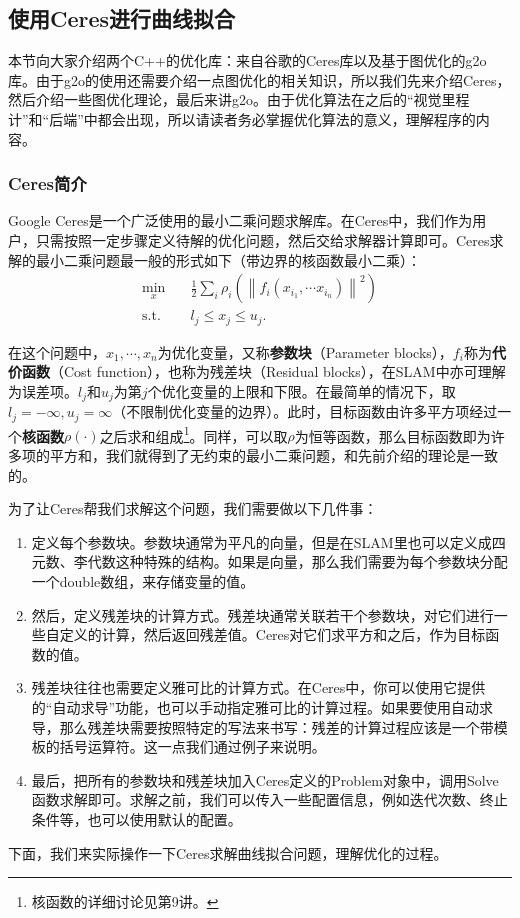 \subsection{使用Ceres进行曲线拟合}
本节向大家介绍两个C++的优化库：来自谷歌的Ceres库\textsuperscript{\cite{Ceres}}以及基于图优化的g2o库\textsuperscript{\cite{Kummerle2011}}。由于g2o的使用还需要介绍一点图优化的相关知识，所以我们先来介绍Ceres，然后介绍一些图优化理论，最后来讲g2o。由于优化算法在之后的“视觉里程计”和“后端”中都会出现，所以请读者务必掌握优化算法的意义，理解程序的内容。

\subsubsection{Ceres简介}
Google Ceres是一个广泛使用的最小二乘问题求解库。在Ceres中，我们作为用户，只需按照一定步骤定义待解的优化问题，然后交给求解器计算即可。Ceres求解的最小二乘问题最一般的形式如下（带边界的核函数最小二乘）：
\begin{equation}
\begin{array}{ll}
\min \limits_x \quad & \frac{1}{2}\sum\limits_i {{\rho _i}\left( {{{\left\| {{f_i}\left( {{x_{{i_1}}}, \cdots {x_{{i_n}}}} \right)} \right\|}^2}} \right)} \\
\mathrm{s.t.} \quad & {l_j} \leqslant {x_j} \leqslant {u_j}.
\end{array}
\end{equation}

在这个问题中，$x_1, \cdots, x_n$为优化变量，又称\textbf{参数块}（Parameter blocks），$f_i$称为\textbf{代价函数}（Cost function），也称为残差块（Residual blocks），在SLAM中亦可理解为误差项。$l_j$和$u_j$为第$j$个优化变量的上限和下限。在最简单的情况下，取$l_j = -\infty, u_j=\infty$（不限制优化变量的边界）。此时，目标函数由许多平方项经过一个\textbf{核函数}$\rho(\cdot)$之后求和组成\footnote{核函数的详细讨论见第9讲。}。同样，可以取$\rho$为恒等函数，那么目标函数即为许多项的平方和，我们就得到了无约束的最小二乘问题，和先前介绍的理论是一致的。

为了让Ceres帮我们求解这个问题，我们需要做以下几件事：
\begin{enumerate}
\item 定义每个参数块。参数块通常为平凡的向量，但是在SLAM里也可以定义成四元数、李代数这种特殊的结构。如果是向量，那么我们需要为每个参数块分配一个double数组，来存储变量的值。
\item 然后，定义残差块的计算方式。残差块通常关联若干个参数块，对它们进行一些自定义的计算，然后返回残差值。Ceres对它们求平方和之后，作为目标函数的值。
\item 残差块往往也需要定义雅可比的计算方式。在Ceres中，你可以使用它提供的“自动求导”功能，也可以手动指定雅可比的计算过程。如果要使用自动求导，那么残差块需要按照特定的写法来书写：残差的计算过程应该是一个带模板的括号运算符。这一点我们通过例子来说明。
\item 最后，把所有的参数块和残差块加入Ceres定义的Problem对象中，调用Solve函数求解即可。求解之前，我们可以传入一些配置信息，例如迭代次数、终止条件等，也可以使用默认的配置。
\end{enumerate}
下面，我们来实际操作一下Ceres求解曲线拟合问题，理解优化的过程。

